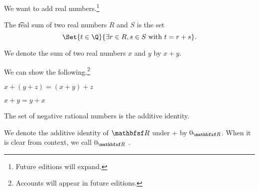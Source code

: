

We want to add real numbers.\footnote{Future editions will expand.}


The \t{real sum} of two real numbers $R$ and $S$ is the set
\[
  \Set{t \in \Q}{\exists r \in R, s \in S \text{ with } t = r + s}.
\]


We denote the sum of two real numbers $x$ and $y$ by $x + y$.


We can show the following.\footnote{Accounts will appear in future editions.}

\begin{proposition}[Associative]
  $x + (y + z) = (x + y) + z$
\end{proposition}

\begin{proposition}[Commutative]
  $x + y = y + x$
\end{proposition}

\begin{proposition}[Identity]
  The set of negative rational numbers is the additive identity.
\end{proposition}

We denote the additive identity of $\R$ under $+$ by $0_{\R}$.
When it is clear from context, we call $0_{\R}$ .

\blankpage
